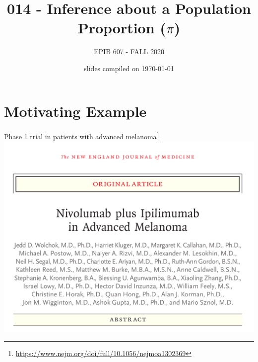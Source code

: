 \documentclass[10pt]{beamer}\usepackage[]{graphicx}\usepackage[]{color}
\begin{document}
	


	\title{014 - Inference about a Population Proportion ($\pi$)}
\author{EPIB 607 - FALL 2020}

\date{slides compiled on \today}

\maketitle


\section{Motivating Example}

\begin{frame}{Phase 1 trial in patients with advanced melanoma\footnote{\tiny \url{https://www.nejm.org/doi/full/10.1056/nejmoa1302369}}}
	\centering
\includegraphics[scale=0.25]{wolchok.png}
\end{frame}
\end{document}
